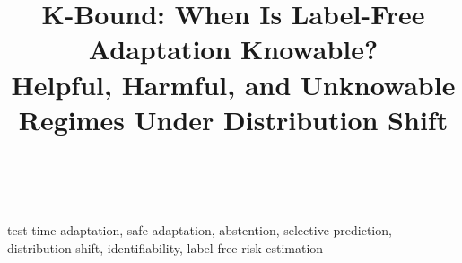 \documentclass[conference]{IEEEtran}
\title{K-Bound: When Is Label-Free Adaptation Knowable? \\
Helpful, Harmful, and Unknowable Regimes Under Distribution Shift}
\author{\IEEEauthorblockN{Pratik Niroula}\\
\IEEEauthorblockA{Minnesota State University, Mankato\\}}
\theoremstyle{plain}
\theoremstyle{definition}
\theoremstyle{remark}
\begin{document}
\maketitle

\begin{abstract}

\end{abstract}


\begin{IEEEkeywords}
test-time adaptation, safe adaptation, abstention, selective prediction, distribution shift, identifiability, label-free risk estimation
\end{IEEEkeywords}



\appendices



\end{document}
